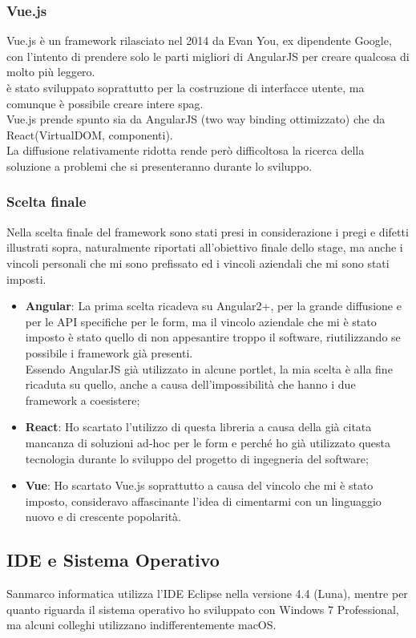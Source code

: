 \subsubsection{Vue.js}
Vue.js è un framework rilasciato nel 2014 da Evan You, ex dipendente Google, con l'intento di prendere solo le parti migliori di AngularJS per creare qualcosa di molto più leggero.\\
è stato sviluppato soprattutto per la costruzione di interfacce utente, ma comunque è possibile creare intere \gls{spag}.\\
Vue.js prende spunto sia da AngularJS (two way binding ottimizzato) che da React(VirtualDOM, componenti). \\
La diffusione relativamente ridotta rende però difficoltosa la ricerca della soluzione a problemi che si presenteranno durante lo sviluppo.

\subsubsection{Scelta finale}
Nella scelta finale del framework sono stati presi in considerazione i pregi e difetti illustrati sopra, naturalmente riportati all'obiettivo finale dello stage, ma anche i vincoli personali che mi sono prefissato ed i vincoli aziendali che mi sono stati imposti.
\begin{itemize}
	\item \textbf{Angular}: La prima scelta ricadeva su Angular2+, per la grande diffusione e per le API specifiche per le form, ma il vincolo aziendale che mi è stato imposto è stato quello di non appesantire troppo il software, riutilizzando se possibile i \gls{framework} già presenti.\\
	Essendo AngularJS già utilizzato in alcune \gls{portlet}, la mia scelta è alla fine ricaduta su quello, anche a causa dell'impossibilità che hanno i due \gls{framework} a coesistere;
	\item \textbf{React}: Ho scartato l'utilizzo di questa libreria a causa della già citata mancanza di soluzioni ad-hoc per le form e perché ho già utilizzato questa tecnologia durante lo sviluppo del progetto di ingegneria del software;
	\item \textbf{Vue}: Ho scartato Vue.js soprattutto a causa del vincolo che mi è stato imposto, consideravo affascinante l'idea di cimentarmi con un linguaggio nuovo e di crescente popolarità.
\end{itemize}
\subsection{IDE e Sistema Operativo}
Sanmarco informatica utilizza l'IDE Eclipse nella versione 4.4 (Luna), mentre per quanto riguarda il sistema operativo ho sviluppato con Windows 7 Professional, ma alcuni colleghi utilizzano indifferentemente macOS.

